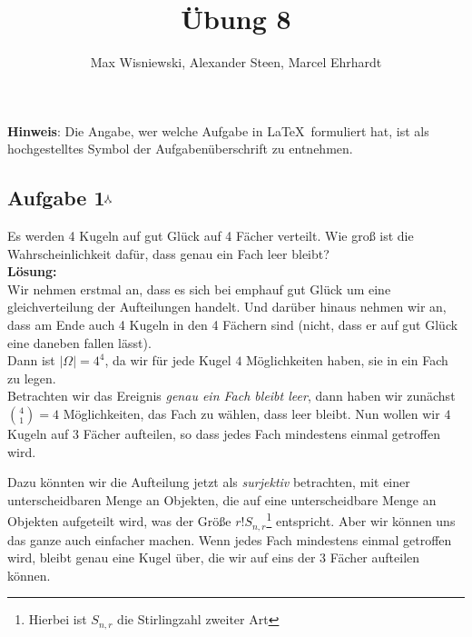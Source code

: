 \documentclass[11pt,a4paper,ngerman]{article}
\date{}
\title{Übung 8}
\author{Max Wisniewski\maxw, Alexander Steen\alex, Marcel Ehrhardt\marcel}
\newcommand{\maxw}{$^\curlywedgedownarrow$}
\begin{document}

\renewcommand{\figurename}{Figure}

\maketitle
\thispagestyle{fancy}

\begin{center}
\textbf{Hinweis}: Die Angabe, wer welche Aufgabe in \LaTeX\ formuliert hat, ist als hochgestelltes Symbol der Aufgabenüberschrift zu entnehmen.
\end{center}


\subsection*{Aufgabe 1\maxw}

Es werden 4 Kugeln auf gut Glück auf 4 Fächer verteilt. Wie groß ist die Wahrscheinlichkeit dafür, dass genau ein Fach leer bleibt?\\

\textbf{Lösung:}\\

Wir nehmen erstmal an, dass es sich bei emph{auf gut Glück} um eine gleichverteilung der Aufteilungen handelt. Und darüber hinaus nehmen
wir an, dass am Ende auch 4 Kugeln in den 4 Fächern sind (nicht, dass er auf gut Glück eine daneben fallen lässt).\\

Dann ist $\left| \Omega \right| = 4^4$, da wir für jede Kugel $4$ Möglichkeiten haben, sie in ein Fach zu legen.\\

Betrachten wir das Ereignis \emph{genau ein Fach bleibt leer}, dann haben wir zunächst $\binom{4}{1} = 4$ Möglichkeiten, das Fach zu wählen,
dass leer bleibt. Nun wollen wir $4$ Kugeln auf $3$ Fächer aufteilen, so dass jedes Fach mindestens einmal getroffen wird.

Dazu könnten wir die Aufteilung jetzt als \emph{surjektiv} betrachten, mit einer unterscheidbaren Menge an Objekten, die auf eine unterscheidbare
Menge an Objekten aufgeteilt wird, was der Größe $r!S_{n,r}$\footnote{Hierbei ist $S_{n,r}$ die Stirlingzahl zweiter Art} entspricht. Aber wir können uns
das ganze auch einfacher machen. Wenn jedes Fach mindestens einmal getroffen wird, bleibt genau eine Kugel über, die wir auf eins der 3 Fächer aufteilen können.
\end{document}
